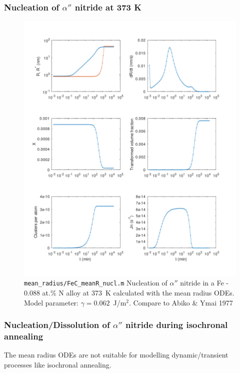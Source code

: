 \documentclass[12pt,a4paper]{article}
\begin{document}
\pagebreak

\subsubsection{Nucleation of $\alpha ''$ nitride at 373 K}

\begin{figure}[h]
\centering
\includegraphics[width=14cm]{../mean_radius/FeN_meanR_nucl.pdf} 
\caption{\texttt{mean\_radius/FeC\_meanR\_nucl.m} Nucleation of $\alpha ''$ nitride in a Fe - 0.088 at.\% N alloy at 373~K calculated with the mean radius ODEs. Model parameter: $\gamma = 0.062$~J/m$^2$. Compare to Abiko \& Ymai 1977}
\end{figure}

\pagebreak

\subsubsection{Nucleation/Dissolution of $\alpha ''$ nitride during isochronal annealing}

The mean radius ODEs are not suitable for modelling dynamic/transient processes like isochronal annealing. 
\end{document}
